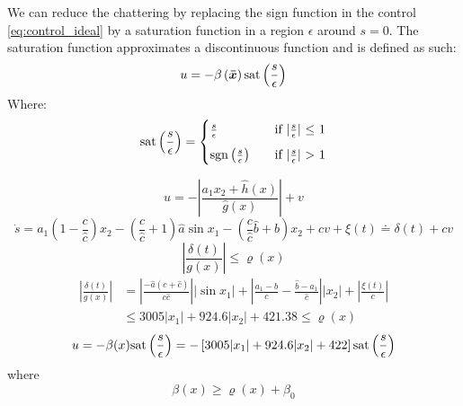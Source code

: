 We can reduce the chattering by replacing the sign function in the control \ref{eq:control_ideal} by a saturation function in a region $\epsilon$ around $s=0$. The saturation function approximates a discontinuous function and is defined as such:
\begin{equation}
  u = -\beta\left( \bm{\bar{x}} \right) \mathrm{sat}\left( \frac{s}{\epsilon} \right)
\end{equation}
Where:
\begin{equation}
  \mathrm{sat}\left( \frac{s}{\epsilon} \right) =
  \begin{cases}
    \frac{s}{\epsilon} &\quad \text{if $\vert\frac{s}{\epsilon}\vert$ $\leq$ 1} \\[2mm]
    \mathrm{sgn}\left( \frac{s}{\epsilon} \right) &\quad \text{if $\vert \frac{s}{\epsilon}\vert$ $>$ 1}
  \end{cases}
\end{equation}

\begin{equation}
        u = -\left \vert \frac{a_1 x_2 + \hat{h}(x)}{\hat{g}(x)} \right\vert + v
\end{equation}
\begin{equation}
        \dot{s} = a_1\left(1 - \frac{c}{\hat{c}}\right) x_2 - \left(\frac{c}{\hat{c}} + 1\right)\hat{a} \sin x_1 - \left(\frac{c}{\hat{c}}\hat{b} + b\right) x_2 + cv + \xi(t) \doteq \delta(t) + cv
\end{equation}
\begin{equation}
        \left \vert \frac{\delta(t)}{g(x)} \right\vert \leq \varrho(x)
\end{equation}
\begin{equation}
\begin{split}
        \left \vert \frac{\delta(t)}{g(x)} \right\vert &= \left \vert \frac{-\hat{a}(c+\hat{c})}{c\hat{c}} \right \vert \vert \sin x_1 \vert + \left \vert \frac{a_1 - b}{c} - \frac{\hat{b} - a_1}{\hat{c}} \right \vert \vert x_2 \vert + \left\vert \frac{\xi(t)}{c}\right\vert \\
        &\leq 3005 \vert x_1 \vert + 924.6\vert x_2 \vert + 421.38  \leq \varrho(x)
\end{split}
\end{equation}
\begin{equation}
        u = -\beta(x)\mathrm{sat}\left(\frac{s}{\epsilon}\right) =  -\left[ 3005 \vert x_1 \vert + 924.6\vert x_2 \vert + 422 \right]\mathrm{sat}\left(\frac{s}{\epsilon}\right)
\end{equation}
where
\begin{equation}
        \beta(x) \geq \varrho(x) + \beta_0
\end{equation}